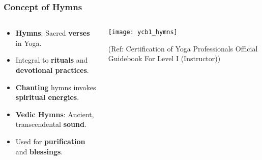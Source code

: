 \begin{frame}[fragile]\frametitle{Concept of Hymns}
\begin{columns}
    \begin{column}[T]{0.5\linewidth}
      \begin{itemize}
        \item \textbf{Hymns}: Sacred \textbf{verses} in Yoga.
        \item Integral to \textbf{rituals} and \textbf{devotional practices}.
        \item \textbf{Chanting} hymns invokes \textbf{spiritual energies}.
        \item \textbf{Vedic Hymns}: Ancient, transcendental \textbf{sound}.
        \item Used for \textbf{purification} and \textbf{blessings}.
      \end{itemize}
    \end{column}
    \begin{column}[T]{0.5\linewidth}
        \begin{center}
        \texttt{[image: ycb1\_hymns]}

		{\tiny (Ref: Certification  of Yoga Professionals Official Guidebook For Level I (Instructor))}	
        \end{center}	
    \end{column}
\end{columns}
\end{frame}


